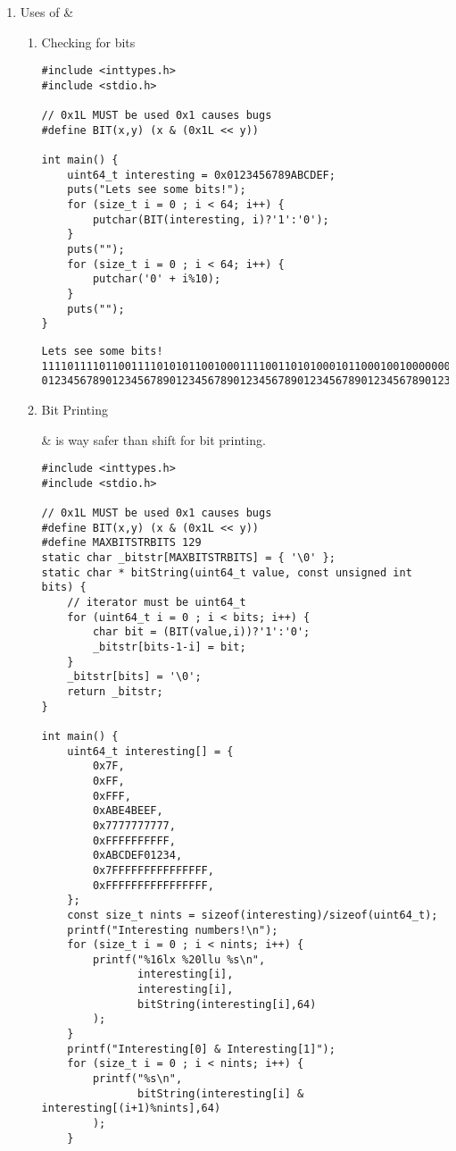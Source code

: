 \documentclass[11pt]{article}
\begin{document}
\begin{enumerate}
\item Uses of \&
\label{sec:org2a4ef3c}

\begin{enumerate}
\item Checking for bits
\label{sec:orgae8d45d}

\begin{verbatim}
#include <inttypes.h>
#include <stdio.h>

// 0x1L MUST be used 0x1 causes bugs
#define BIT(x,y) (x & (0x1L << y))

int main() {
    uint64_t interesting = 0x0123456789ABCDEF;
    puts("Lets see some bits!");
    for (size_t i = 0 ; i < 64; i++) {
        putchar(BIT(interesting, i)?'1':'0');
    }
    puts("");
    for (size_t i = 0 ; i < 64; i++) {
        putchar('0' + i%10);
    }
    puts("");
}
\end{verbatim}

\begin{verbatim}
Lets see some bits!
1111011110110011110101011001000111100110101000101100010010000000
0123456789012345678901234567890123456789012345678901234567890123
\end{verbatim}


\item Bit Printing
\label{sec:org6643662}

\& is way safer than shift for bit printing.

\begin{verbatim}
#include <inttypes.h>
#include <stdio.h>

// 0x1L MUST be used 0x1 causes bugs
#define BIT(x,y) (x & (0x1L << y))
#define MAXBITSTRBITS 129
static char _bitstr[MAXBITSTRBITS] = { '\0' };
static char * bitString(uint64_t value, const unsigned int bits) {
    // iterator must be uint64_t
    for (uint64_t i = 0 ; i < bits; i++) {
        char bit = (BIT(value,i))?'1':'0';
        _bitstr[bits-1-i] = bit;
    }
    _bitstr[bits] = '\0';
    return _bitstr;
}

int main() {
    uint64_t interesting[] = {
        0x7F,
        0xFF,
        0xFFF,
        0xABE4BEEF,
        0x7777777777,
        0xFFFFFFFFFF,
        0xABCDEF01234,
        0x7FFFFFFFFFFFFFFF,
        0xFFFFFFFFFFFFFFFF,
    };
    const size_t nints = sizeof(interesting)/sizeof(uint64_t);
    printf("Interesting numbers!\n");
    for (size_t i = 0 ; i < nints; i++) {
        printf("%16lx %20llu %s\n",
               interesting[i],
               interesting[i],
               bitString(interesting[i],64)
        );
    }
    printf("Interesting[0] & Interesting[1]");
    for (size_t i = 0 ; i < nints; i++) {
        printf("%s\n",
               bitString(interesting[i] & interesting[(i+1)%nints],64)
        );
    }


\end{verbatim}
\end{enumerate}
\end{enumerate}
\end{document}
